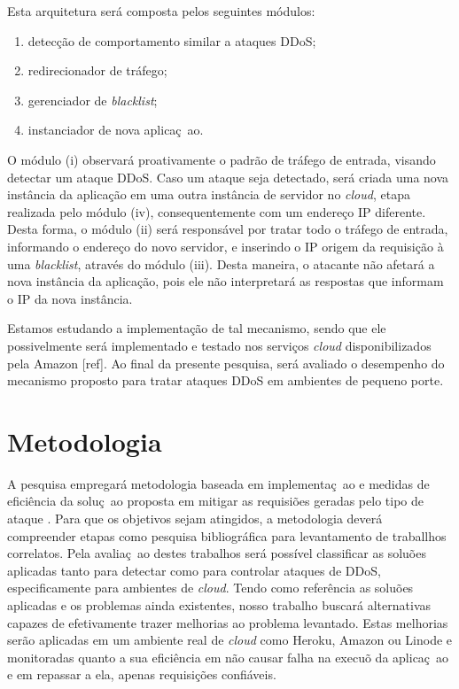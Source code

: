 \documentclass[a4paper, 11pt]{article}
\begin{document}
Esta arquitetura será composta pelos seguintes módulos:
\begin{enumerate}[i]
  \item detecção de comportamento similar a ataques DDoS;
  \item redirecionador de tráfego;
  \item gerenciador de \emph{blacklist};
  \item instanciador de nova aplica\c{c}~{a}o.
\end{enumerate}  

O módulo (i) observará proativamente o padrão de tráfego de entrada, visando
detectar um ataque DDoS. Caso um ataque seja detectado, será criada uma nova
instância da aplicação em uma outra instância de servidor no \emph{cloud}, etapa
realizada pelo m\'odulo (iv), consequentemente com um endereço IP diferente.
Desta forma, o módulo (ii) será responsável por tratar todo o tráfego de
entrada, informando o endereço do novo servidor, e inserindo o IP origem da
requisição à uma \emph{blacklist}, através do módulo (iii). Desta maneira, o
atacante não afetará a nova instância da aplicação, pois ele não interpretará as
respostas que informam o IP da nova instância. 

Estamos estudando a implementação de tal mecanismo, sendo que ele possivelmente
será implementado e testado nos serviços \emph{cloud} disponibilizados pela
Amazon [ref]. Ao final da presente pesquisa, ser\'a avaliado o
desempenho do mecanismo proposto para tratar ataques DDoS em ambientes de
pequeno porte.


\section{Metodologia}
A pesquisa empregar\'a metodologia baseada em implementa\c{c}~{a}o e medidas de
efici\^encia da solu\c{c}~{a}o proposta em mitigar as requisi\cc\~oes geradas
pelo
tipo de ataque . Para que os objetivos sejam atingidos, a metodologia dever\'a
compreender etapas como pesquisa bibliogr\'afica para levantamento de traballhos
correlatos. Pela avalia\c{c}~{a}o destes trabalhos ser\'a poss\'ivel classificar
as
solu\cc\~oes aplicadas tanto para detectar como para controlar ataques de DDoS,
especificamente para ambientes de \emph{cloud}. Tendo como refer\^encia as
solu\cc\~oes aplicadas e os problemas ainda existentes, nosso trabalho buscar\'a
alternativas capazes de efetivamente trazer melhorias ao problema levantado.
Estas melhorias ser\~ao aplicadas em um ambiente real de \emph{cloud} como
Heroku, Amazon
ou Linode e monitoradas quanto a sua efici\^encia em n\~ao causar falha na
execu\cca\~o da aplica\c{c}~{a}o e em repassar a ela, apenas requisições
confi\'aveis.
\end{document}
